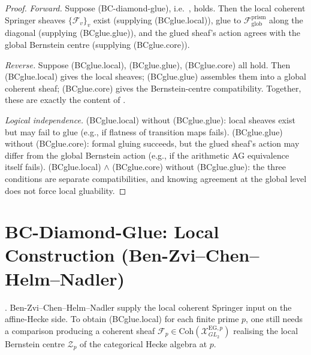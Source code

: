 \begin{proof}
\emph{Forward.} Suppose (BC-diamond-glue), i.e.\
, holds. Then the
local coherent Springer sheaves \(\{\mathcal{F}_{v}\}_{v}\) exist
(supplying (BCglue.local)), glue to
\(\mathcal{F}_{\mathrm{glob}}^{\mathrm{prism}}\) along the diagonal
(supplying (BCglue.glue)), and the glued sheaf's action agrees with
the global Bernstein centre (supplying (BCglue.core)).

\emph{Reverse.} Suppose (BCglue.local), (BCglue.glue),
(BCglue.core) all hold. Then (BCglue.local) gives the local sheaves;
(BCglue.glue) assembles them into a global coherent sheaf;
(BCglue.core) gives the Bernstein-centre compatibility. Together,
these are exactly the content of
.

\emph{Logical independence.} (BCglue.local) without (BCglue.glue):
local sheaves exist but may fail to glue (e.g., if
flatness of transition maps fails). (BCglue.glue) without
(BCglue.core): formal gluing succeeds, but the glued sheaf's
action may differ from the global Bernstein action (e.g., if the
arithmetic AG equivalence itself fails). (BCglue.local) \(\wedge\)
(BCglue.core) without (BCglue.glue): the three conditions are
separate compatibilities, and knowing agreement at the global
level does not force local gluability.
\end{proof}

\section{BC-Diamond-Glue: Local Construction (Ben-Zvi--Chen--Helm--Nadler)}
\label{v4-arith:bcglue-k5:local}

\begin{theorem}
\label{v4-arith:bcglue-k5:thm:local-BZCHN-plus-EG}
\ClaimStatusNeedsVerification. Ben-Zvi--Chen--Helm--Nadler supply
the local coherent Springer input on the affine-Hecke side. To obtain
(BCglue.local) for each finite prime \(p\), one still needs a
comparison producing a coherent sheaf
\(\mathcal{F}_{p}\in\mathrm{Coh}(\mathcal{X}^{\mathrm{EG},p}_{GL_{2}})\)
realising the local Bernstein centre \(\mathcal{Z}_{p}\) of the
categorical Hecke algebra at \(p\).
\end{theorem}

